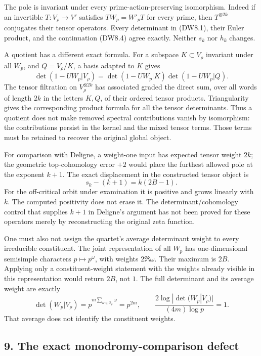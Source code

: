 The pole is invariant under every prime-action-preserving isomorphism.
Indeed if an invertible \(T:V_\rho\to V'\) satisfies \(TW_p=W'_pT\) for
every prime, then \(T^{\otimes2k}\) conjugates their tensor operators.
Every determinant in (DW8.1), their Euler product, and the continuation
(DW8.4) agree exactly. Neither \(s_k\) nor \(h_k\) changes.

A quotient has a different exact formula. For a subspace
\(K\subset V_\rho\) invariant under all \(W_p\), and \(Q=V_\rho/K\), a
basis adapted to \(K\) gives \[
\det(1-UW_p|V_\rho)
=\det(1-UW_p|K)\det(1-UW_p|Q).
\tag{DW8.7d}
\] The tensor filtration on \(V_\rho^{\otimes2k}\) has associated graded
the direct sum, over all words of length \(2k\) in the letters \(K,Q\),
of their ordered tensor products. Triangularity gives the corresponding
product formula for all the tensor determinants. Thus a quotient does
not make removed spectral contributions vanish by isomorphism: the
contributions persist in the kernel and the mixed tensor terms. Those
terms must be retained to recover the original global object.

For comparison with Deligne, a weight-one input has expected tensor
weight \(2k\); the geometric top-cohomology error \(+2\) would place the
furthest allowed pole at the exponent \(k+1\). The exact displacement in
the constructed tensor object is \[
s_k-(k+1)=k(2B-1).
\tag{DW8.11}
\] For the off-critical orbit under examination it is positive and grows
linearly with \(k\). The computed positivity does not erase it. The
determinant/cohomology control that supplies \(k+1\) in Deligne's
argument has not been proved for these operators merely by
reconstructing the original zeta function.

One must also not assign the quartet's average determinant weight to
every irreducible constituent. The joint representation of all \(W_p\)
has one-dimensional semisimple characters \(p\mapsto p^\omega\), with
weights \(2\Re\omega\). Their maximum is \(2B\). Applying only a
constituent-weight statement with the weights already visible in this
representation would return \(2B\), not \(1\). The full determinant and
its average weight are exactly \[
\det(W_p|V_\rho)=p^{m\sum_{\omega\in\mathcal O_\rho}\omega}=p^{2m},
\qquad
\frac{2\log|\det(W_p|V_\rho)|}{(4m)\log p}=1.
\tag{DW8.12}
\] That average does not identify the constituent weights.

\subsection{9. The exact monodromy-comparison
defect}\label{the-exact-monodromy-comparison-defect}

